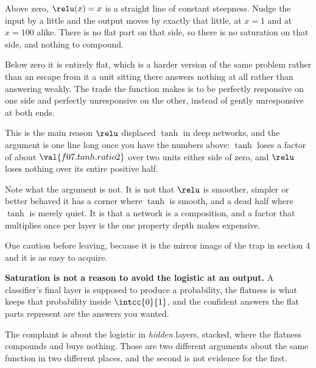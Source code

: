 \begin{fr}
Above zero, $\relu(x) = x$ is a straight line of constant steepness. Nudge the
input by a little and the output moves by exactly that little, at $x = 1$ and
at $x = 100$ alike. There is no flat part on that side, so there is no
saturation on that side, and nothing to compound.

Below zero it is entirely flat, which is a harder version of the same problem
rather than an escape from it \dash{} a unit sitting there answers nothing at
all rather than answering weakly. The trade the function makes is to be
perfectly responsive on one side and perfectly unresponsive on the other,
instead of gently unresponsive at both ends.

\begin{aibox}
This is the main reason $\relu$ displaced $\tanh$ in deep networks, and the
argument is one line long once you have the numbers above: $\tanh$ loses a
factor of about $\val{f07.tanh.ratio2}$ over two units either side of zero,
and $\relu$ loses nothing over its entire positive half.

Note what the argument is not. It is not that $\relu$ is smoother, simpler or
better behaved \dash{} it has a corner where $\tanh$ is smooth, and a dead
half where $\tanh$ is merely quiet. It is that a network is a composition, and
a factor that multiplies once per layer is the one property depth makes
expensive.
\end{aibox}
\end{fr}

\begin{fr}
One caution before leaving, because it is the mirror image of the trap in
section 4 and it is as easy to acquire.

\textbf{Saturation is not a reason to avoid the logistic at an output.} A
classifier's final layer is supposed to produce a probability, the flatness is
what keeps that probability inside $\intcc{0}{1}$, and the confident answers
the flat parts represent are the answers you wanted.

The complaint is about the logistic in \emph{hidden} layers, stacked, where
the flatness compounds and buys nothing. Those are two different arguments
about the same function in two different places, and the second is not
evidence for the first.
\end{fr}


